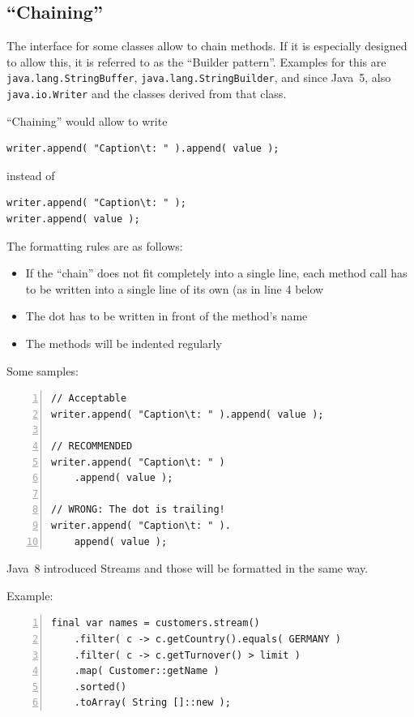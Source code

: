 \documentclass[12pt,a4paper,titlepage, parskip=half, headsepline, footsepline, cleardoubleplain]{scrbook}
\begin{document}
\subsection{“Chaining”}
The interface for some classes allow to chain methods. If it is especially designed to allow this, it is referred to as the “Builder pattern”. Examples for this are \lstinline|java.lang.StringBuffer|, \lstinline|java.lang.StringBuilder|, and since Java~5, also \lstinline|java.io.Writer| and the classes derived from that class.

“Chaining” would allow to write

\begin{lstlisting}
writer.append( "Caption\t: " ).append( value );
\end{lstlisting}

instead of

\begin{lstlisting}
writer.append( "Caption\t: " );
writer.append( value );
\end{lstlisting}

The formatting rules are as follows:
\begin{itemize}
\item{If the “chain” does not fit completely into a single line, each method call has to be written into a single line of its own (as in line 4 below}
\item{The dot has to be written in front of the method's name}
\item{The methods will be indented regularly}
\end{itemize}

Some samples:
\begin{lstlisting}[numbers=left]
// Acceptable
writer.append( "Caption\t: " ).append( value );

// RECOMMENDED
writer.append( "Caption\t: " )
    .append( value );
    
// WRONG: The dot is trailing!
writer.append( "Caption\t: " ).
    append( value );
\end{lstlisting}

Java~8 introduced Streams and those will be formatted in the same way.

Example:
\begin{lstlisting}[numbers=left]
final var names = customers.stream()
    .filter( c -> c.getCountry().equals( GERMANY )
    .filter( c -> c.getTurnover() > limit )
    .map( Customer::getName )
    .sorted()
    .toArray( String []::new );
\end{lstlisting}
\end{document}
